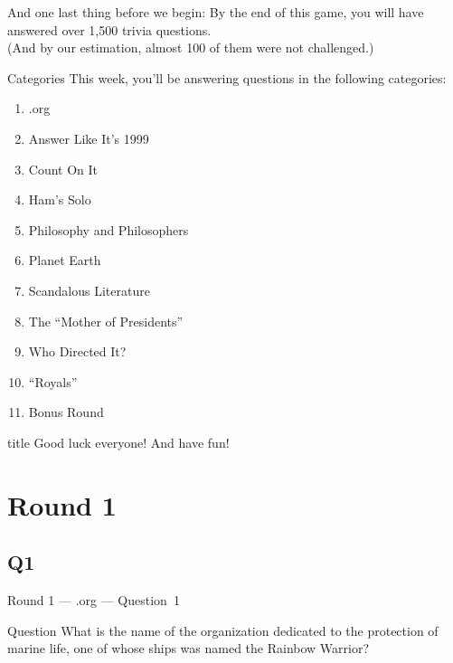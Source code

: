 \documentclass[11pt]{beamer}
\begin{document}
\begin{frame}
And one last thing before we begin: By the end of this game, you will have answered
over 1,500 trivia questions.
\pause
\\
\bigskip
(And by our estimation, almost 100 of them were not \mbox{challenged}.)
\end{frame}

\begingroup{}
\begingroup{}
\begin{frame}[t]{Categories}
This week, you'll be answering questions in the following categories:
\begin{enumerate}
\item .org
\item Answer Like It's 1999
\item Count On It
\item Ham's Solo
\item Philosophy and Philosophers
\item Planet Earth
\item Scandalous Literature
\item The ``Mother of Presidents''
\item Who Directed It?
\item ``Royals''
\item Bonus Round
\end{enumerate}
\end{frame}
\endgroup{}

\begingroup{}
\begin{frame}
\vfill{}
\begin{beamercolorbox}[sep=8pt,center,shadow=true,rounded=true]{title}
Good luck everyone! And have fun!
\end{beamercolorbox}
\vfill{}
\end{frame}
\endgroup{}
\def\thisSectionName{.org}
\section{Round 1}
\subsection*{Q1}
\begin{frame}[t]{Round 1 --- .org --- \mbox{Question 1}}
\vspace{-0.5em}
\begin{block}{Question}
What is the name of the organization dedicated to  the protection of marine life, one of whose ships was named the Rainbow Warrior?
\end{block}
\end{frame}
\end{document}
